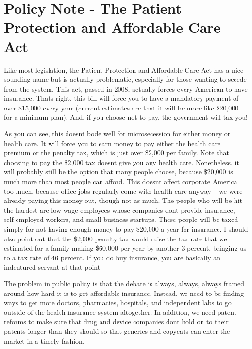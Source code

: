\documentclass[letterpaper]{article}
\begin{document}
\section{Policy Note - The Patient Protection and Affordable Care Act}
{\color{black}
Like most legislation, the Patient Protection and Affordable Care Act
has a nice-sounding name but is
\textcolor[rgb]{0.32941177,0.5529412,0.83137256}{actually} problematic,
especially for those wanting to secede from the system. This act,
passed in 2008, actually forces every American to have insurance.
That{\textquotesingle}s right, this bill will force you to have a
mandatory payment of over \$15,000 every year (current estimates are
that it will be more like \$20,000 for a minimum plan). And, if you
choose not to pay, the government will tax you!  }

{\color{black}
As you can see, this doesn{\textquotesingle}t bode well for
microsecession for either money or health care. It will force you to
earn money to pay either the health care premium or the penalty tax,
which is just over \$2,000 per family. Note that choosing to pay the
\$2,000 tax doesn{\textquotesingle}t give you any health care. 
Nonetheless, it will probably still be the option that many people
choose, because \$20,000 is much more than most people can afford. 
This doesn{\textquotesingle}t affect corporate America too much,
because office jobs regularly come with health care anyway – we were
already paying this money out, though not as much.  The people who will
be hit the hardest are low-wage employees whose companies
don{\textquotesingle}t provide insurance, self-employed workers, and
small business startups.  These people will be taxed simply for not
having enough money to pay \$20,000 a year for insurance.  I should
also point out that the \$2,000 penalty tax would raise the tax rate
that we estimated for a family making \$60,000 per year by another 3
percent, bringing us to a tax rate of 46 percent. If you do buy
insurance, you are basically an indentured servant at that point.}

{\color{black}
The problem in public policy is that the debate is always, always,
always framed around how hard it is to get affordable insurance.
Instead, we need to be finding ways to get more doctors, pharmacies,
hospitals, and independent labs
\textcolor[rgb]{0.32941177,0.5529412,0.83137256}{to go }outside of the
health insurance system altogether. In addition, we need patent reforms
to make sure that drug and device companies don{\textquotesingle}t hold
on to their patents longer than they should so that generics and
copycats can enter the market in a timely fashion.}
\end{document}
